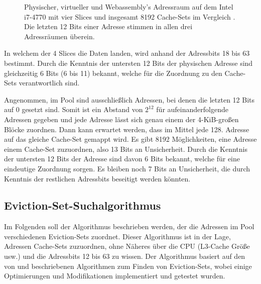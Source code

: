 \label{fig:address_layout}
\begin{figure}[h]
\centering
\begin{scaletikzpicturetowidth}{\textwidth}

\end{scaletikzpicturetowidth}
\caption{Physischer, virtueller und Webassembly's Adressraum auf dem Intel i7-4770 mit vier Slices und insgesamt 8192 Cache-Sets im Vergleich \cite{DriveByPaper}. Die letzten 12 Bits einer Adresse stimmen in allen drei Adressräumen überein.}
\end{figure}

In welchem der 4 Slices die Daten landen, wird anhand der Adressbits 18 bis 63 bestimmt.
Durch die Kenntnis der untersten 12 Bits der physischen Adresse sind gleichzeitig 6 Bits (6 bis 11) bekannt, welche für die Zuordnung zu den Cache-Sets verantwortlich sind.

Angenommen, im Pool sind ausschließlich Adressen, bei denen die letzten 12 Bits auf 0 gesetzt sind. 
Somit ist ein Abstand von $2^{12}$ für aufeinanderfolgende Adressen gegeben und jede Adresse lässt sich genau einem der 4-KiB-großen Blöcke zuordnen.
Dann kann erwartet werden, dass im Mittel jede 128. 
Adresse auf das gleiche Cache-Set gemappt wird. Es gibt 8192 Möglichkeiten, eine Adresse einem Cache-Set zuzuordnen, also 13 Bits an Unsicherheit.
Durch die Kenntnis der untersten 12 Bits der Adresse sind davon 6 Bits bekannt, welche für eine eindeutige Zuordnung sorgen. 
Es bleiben noch 7 Bits an Unsicherheit, die durch Kenntnis der restlichen Adressbits beseitigt werden könnten.

\subsection{Eviction-Set-Suchalgorithmus}
\label{evictionSetSearchAlgo}

Im Folgenden soll der Algorithmus beschrieben werden, der die Adressen im Pool verschiedenen Eviction-Sets zuordnet.
Dieser Algorithmus ist in der Lage, Adressen Cache-Sets zuzuordnen, ohne Näheres über die CPU (L3-Cache Größe usw.) und die Adressbits 12 bis 63 zu wissen.
Der Algorithmus basiert auf den von \cite{DriveByPaper} und \cite{PrimeAndAbort} beschriebenen Algorithmen zum Finden von Eviction-Sets, wobei einige Optimierungen und Modifikationen implementiert und getestet wurden.

